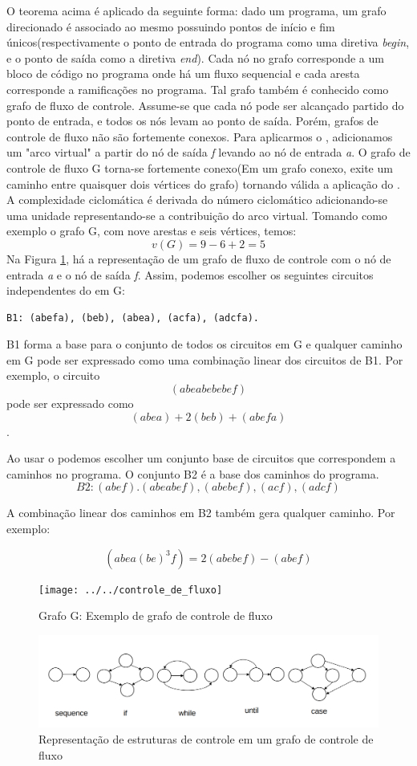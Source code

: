 O teorema acima é aplicado da seguinte forma: dado um programa, um grafo direcionado é associado ao mesmo possuindo pontos de início e fim únicos(respectivamente o ponto de entrada do programa como uma diretiva \textit{begin}, e o ponto de saída como a diretiva \textit{end}). Cada nó no grafo corresponde a um bloco de código no programa onde há um fluxo sequencial e cada aresta corresponde a ramificações no programa. Tal grafo também é conhecido como grafo de fluxo de controle. Assume-se que cada nó pode ser alcançado partido do ponto de entrada, e todos os nós levam ao ponto de saída. Porém, grafos de controle de fluxo não são fortemente conexos. Para aplicarmos o , adicionamos um "arco virtual" a partir do nó de saída \textit{f} levando ao nó de entrada \textit{a}. O grafo de controle de fluxo G torna-se fortemente conexo(Em um grafo conexo, exite um caminho entre quaisquer dois vértices do grafo) tornando válida a aplicação do . A complexidade ciclomática é derivada do número ciclomático adicionando-se uma unidade representando-se a contribuição do arco virtual\cite{watson1996structured}. Tomando como exemplo o grafo G, com nove arestas e seis vértices, temos:
\[v(G) = 9 - 6 + 2 = 5\]
Na Figura \ref{fig:grafo-de-controle-de-fluxo}, há a representação de um grafo de fluxo de controle com o nó de entrada \textit{a} e o nó de saída \textit{f}. 
Assim, podemos escolher os seguintes circuitos independentes do em G:
\begin{verbatim}
B1: (abefa), (beb), (abea), (acfa), (adcfa).
\end{verbatim}
B1 forma a base para o conjunto de todos os circuitos em G e qualquer caminho em G pode ser expressado como uma combinação linear dos circuitos de B1. Por exemplo, o circuito \[(abeabebebef)\] pode ser expressado como \[(abea)+2(beb)+(abefa)\]. 

Ao usar o  podemos escolher um conjunto base de circuitos que correspondem a caminhos no programa. O conjunto B2 é a base dos caminhos do programa.
\[B2: (abef).(abeabef),(abebef),(acf),(adcf)\]

A combinação linear dos caminhos em B2 também gera qualquer caminho. Por exemplo:

\[(abea(be)^3f) = 2(abebef) - (abef)\]


\begin{figure}
	\centering
	\texttt{[image: ../../controle\_de\_fluxo]}
	\caption{Grafo G: Exemplo de grafo de controle de fluxo}
	\label{fig:grafo-de-controle-de-fluxo}
\end{figure}
\begin{figure}
	\centering
	\includegraphics[width=0.5\linewidth]{figure/fluxo_estruturas}
	\caption{Representação de estruturas de controle em um grafo de controle de fluxo}
	\label{fig:fluxoestruturas}
\end{figure}


